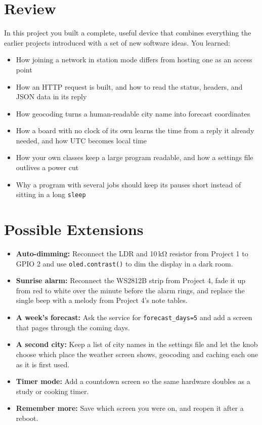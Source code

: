 \section{Review}
In this project you built a complete, useful device that combines everything the earlier projects
introduced with a set of new software ideas. You learned:
\begin{itemize}
    \item How joining a network in station mode differs from hosting one as an access point
    \item How an HTTP request is built, and how to read the status, headers, and JSON data in its reply
    \item How geocoding turns a human-readable city name into forecast coordinates
    \item How a board with no clock of its own learns the time from a reply it already needed, and how
          UTC becomes local time
    \item How your own classes keep a large program readable, and how a settings file outlives a power cut
    \item Why a program with several jobs should keep its pauses short instead of sitting in a long \texttt{sleep}
\end{itemize}

\section{Possible Extensions}
\begin{itemize}
    \item \textbf{Auto-dimming:} Reconnect the LDR and 10\,k\si{\ohm} resistor from Project 1 to GPIO 2 and use
          \texttt{oled.contrast()} to dim the display in a dark room.
    \item \textbf{Sunrise alarm:} Reconnect the WS2812B strip from Project 4, fade it up from red to white
          over the minute before the alarm rings, and replace the single beep with a melody from Project 4's
          note tables.
    \item \textbf{A week's forecast:} Ask the service for \texttt{forecast\_days=5} and add a screen that pages
          through the coming days.
    \item \textbf{A second city:} Keep a list of city names in the settings file and let the knob choose which
          place the weather screen shows, geocoding and caching each one as it is first used.
    \item \textbf{Timer mode:} Add a countdown screen so the same hardware doubles as a study or cooking timer.
    \item \textbf{Remember more:} Save which screen you were on, and reopen it after a reboot.
\end{itemize}
